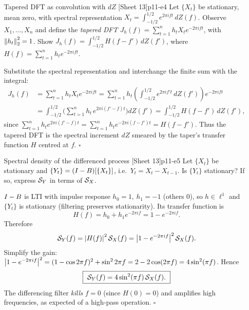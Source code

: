 \begin{exercise}{Tapered DFT as convolution with $dZ$ \quad\textnormal{[Sheet 13]}}{p11-e4}
Let $\{X_t\}$ be stationary, mean zero, with spectral representation
$X_t=\int_{-1/2}^{1/2}e^{2\pi i f t}\,dZ(f)$. Observe $X_1,\dots,X_n$ and define
the \emph{tapered DFT}
$J_h(f)=\sum_{t=1}^n h_t X_t e^{-2\pi i f t}$, with $\left\lVert h_t \right\rVert_2^2=1$. Show
$J_h(f)=\int_{-1/2}^{1/2}H(f-f')\,dZ(f')$, where
$H(f)=\sum_{t=1}^n h_t e^{-2\pi i f t}$.
\end{exercise}
\begin{solution}
Substitute the spectral representation and interchange the finite sum with the
integral:
\[
\begin{aligned}
J_h(f)&=\sum_{t=1}^n h_t X_t e^{-2\pi i f t}
       =\sum_{t=1}^n h_t\!\left(\int_{-1/2}^{1/2}e^{2\pi i f' t}\,dZ(f')\right)\!e^{-2\pi i f t}\\
      &=\int_{-1/2}^{1/2}\Big(\sum_{t=1}^n h_t\,e^{2\pi i (f'-f) t}\Big)dZ(f')
       =\int_{-1/2}^{1/2}H(f-f')\,dZ(f'),
\end{aligned}
\]
since $\sum_{t=1}^n h_t e^{2\pi i(f'-f)t}=\sum_{t=1}^n h_t e^{-2\pi i(f-f')t}
=H(f-f')$. Thus the tapered DFT is the spectral increment $dZ$ smeared by the
taper's transfer function $H$ centred at $f$. \hfill$\square$
\end{solution}

\begin{exercise}{Spectral density of the differenced process \quad\textnormal{[Sheet 13]}}{p11-e5}
Let $\{X_t\}$ be stationary and $\{Y_t\}=(I-B)[\{X_t\}]$, i.e.\
$Y_t=X_t-X_{t-1}$. Is $\{Y_t\}$ stationary? If so, express $\mathcal{S}_Y$ in terms of
$\mathcal{S}_X$.
\end{exercise}
\begin{solution}
$I-B$ is LTI with impulse response $h_0=1,\ h_1=-1$ (others $0$), so
$h\in\ell^1$ and $\{Y_t\}$ is stationary (filtering preserves stationarity). Its
transfer function is
\[
H(f)=h_0+h_1 e^{-2\pi i f}=1-e^{-2\pi i f}.
\]
Therefore
\[
\mathcal{S}_Y(f)=\left\lvert H(f) \right\rvert^2\mathcal{S}_X(f)=\left\lvert 1-e^{-2\pi i f} \right\rvert^2\mathcal{S}_X(f).
\]
Simplify the gain: $\left\lvert 1-e^{-2\pi i f} \right\rvert^2=(1-\cos 2\pi f)^2+\sin^2 2\pi f
=2-2\cos(2\pi f)=4\sin^2(\pi f)$. Hence
\[
\boxed{\ \sdf_Y(f)=4\sin^2(\pi f)\,\sdf_X(f).\ }
\]
The differencing filter \emph{kills} $f=0$ (since $H(0)=0$) and amplifies high
frequencies, as expected of a high-pass operation. \hfill$\square$
\end{solution}

